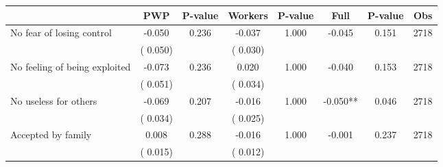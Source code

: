 
\begin{tabular}{l*{7}{c}}\hline&\multicolumn{1}{c}{PWP}&\multicolumn{1}{c}{P-value}&\multicolumn{1}{c}{Workers}&\multicolumn{1}{c}{P-value}&\multicolumn{1}{c}{Full}&\multicolumn{1}{c}{P-value}&\multicolumn{1}{c}{Obs} \\ \hline

 No fear of losing control       &             -0.050       &        0.236  &             -0.037       &        1.000  &             -0.045       &              0.151 &  2718 \\ 
                       &       (       0.050)             &                               &       (       0.030)                     &                               &                                               &                                &                      \\ 

 No feeling of being exploited       &             -0.073       &        0.236  &              0.020       &        1.000  &             -0.040       &              0.153 &  2718 \\ 
                       &       (       0.051)             &                               &       (       0.034)                     &                               &                                               &                                &                      \\ 

 No useless for others       &             -0.069       &        0.207  &             -0.016       &        1.000  &             -0.050**       &              0.046 &  2718 \\ 
                       &       (       0.034)             &                               &       (       0.025)                     &                               &                                               &                                &                      \\ 

 Accepted by family       &              0.008       &        0.288  &             -0.016       &        1.000  &             -0.001       &              0.237 &  2718 \\ 
                       &       (       0.015)             &                               &       (       0.012)                     &                               &                                               &                                &                      \\ 


\end{tabular}
